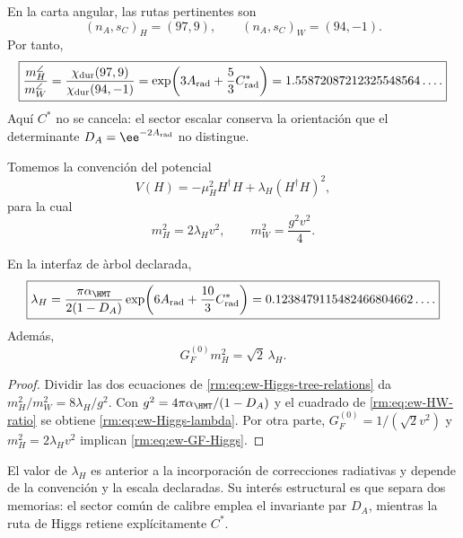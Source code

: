 En la carta angular, las rutas pertinentes son
\begin{equation}
\label{rm:eq:ew-HW-signatures}
(n_A,s_C)_H=(97,9),
\qquad
(n_A,s_C)_W=(94,-1).
\end{equation}
Por tanto,
\begin{equation}
\label{rm:eq:ew-HW-ratio}
\boxed{
\frac{m_H^{\angle}}{m_W^{\angle}}
=\frac{\chi_{\rm dur}(97,9)}{\chi_{\rm dur}(94,-1)}
=\exp\!\left(3A_{\rm rad}+\frac53C^*_{\rm rad}\right)
=1.55872087212325548564\ldots .}
\end{equation}
Aqu\'i \(C^*\) no se cancela: el sector escalar conserva la orientaci\'on
que el determinante \(D_A=\ee^{-2A_{\rm rad}}\) no distingue.

Tomemos la convenci\'on del potencial
\begin{equation}
\label{rm:eq:ew-Higgs-potential}
V(H)=-\mu_H^2H^\dagger H
+\lambda_H(H^\dagger H)^2,
\end{equation}
para la cual
\begin{equation}
\label{rm:eq:ew-Higgs-tree-relations}
m_H^2=2\lambda_Hv^2,
\qquad
m_W^2=\frac{g^2v^2}{4}.
\end{equation}

\begin{corollary}
\label{rm:cor:ew-Higgs-lambda}
En la interfaz de \`arbol declarada,
\begin{equation}
\label{rm:eq:ew-Higgs-lambda}
\boxed{
\lambda_H
=\frac{\pi\alpha_{\HMT}}{2(1-D_A)}
\exp\!\left(6A_{\rm rad}+\frac{10}{3}C^*_{\rm rad}\right)
=0.1238479115482466804662\ldots .}
\end{equation}
Adem\'as,
\begin{equation}
\label{rm:eq:ew-GF-Higgs}
G_F^{(0)}m_H^2=\sqrt2\,\lambda_H.
\end{equation}
\end{corollary}

\begin{proof}
Dividir las dos ecuaciones de
\cref{rm:eq:ew-Higgs-tree-relations} da
\(m_H^2/m_W^2=8\lambda_H/g^2\). Con
\(g^2=4\pi\alpha_{\HMT}/(1-D_A)\) y el cuadrado de
\cref{rm:eq:ew-HW-ratio} se obtiene \cref{rm:eq:ew-Higgs-lambda}. Por otra parte,
\(G_F^{(0)}=1/(\sqrt2v^2)\) y
\(m_H^2=2\lambda_Hv^2\) implican
\cref{rm:eq:ew-GF-Higgs}.
\end{proof}

El valor de \(\lambda_H\) es anterior a la incorporaci\'on de correcciones
radiativas y depende de
la convenci\'on y la escala declaradas. Su inter\'es estructural es que
separa dos memorias: el sector com\'un de calibre emplea el invariante par \(D_A\),
mientras la ruta de Higgs retiene expl\'icitamente \(C^*\).

